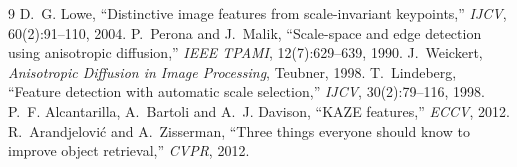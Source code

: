 \documentclass[11pt,a4paper]{article}
\begin{document}
\begin{thebibliography}{9}
 D.~G. Lowe, ``Distinctive image features from
scale-invariant keypoints,'' \emph{IJCV}, 60(2):91--110, 2004.
 P.~Perona and J.~Malik, ``Scale-space and edge detection
using anisotropic diffusion,'' \emph{IEEE TPAMI}, 12(7):629--639, 1990.
 J.~Weickert, \emph{Anisotropic Diffusion in Image
Processing}, Teubner, 1998.
 T.~Lindeberg, ``Feature detection with automatic scale
selection,'' \emph{IJCV}, 30(2):79--116, 1998.
 P.~F. Alcantarilla, A.~Bartoli and A.~J. Davison, ``KAZE
features,'' \emph{ECCV}, 2012.
 R.~Arandjelovi\'c and A.~Zisserman, ``Three things
everyone should know to improve object retrieval,'' \emph{CVPR}, 2012.
\end{thebibliography}
\end{document}
